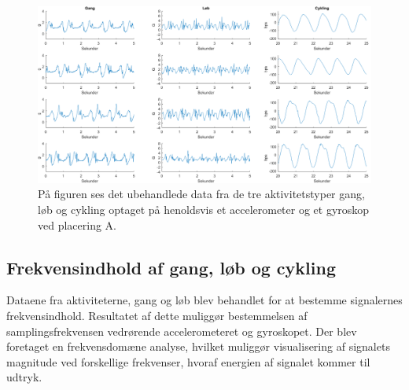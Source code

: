 \begin{figure}[H]
	\centering
	\includegraphics[scale=0.38]{figures/qBilag/raa_data}
	\caption{På figuren ses det ubehandlede data fra de tre aktivitetstyper gang, løb og cykling optaget på henoldsvis et accelerometer og et gyroskop ved placering A.}
	\label{raa_data}
\end{figure}


\subsection{Frekvensindhold af gang, løb og cykling}
Dataene fra aktiviteterne, gang og løb blev behandlet for at bestemme signalernes frekvensindhold. Resultatet af dette muliggør bestemmelsen af samplingsfrekvensen vedrørende accelerometeret og gyroskopet. Der blev foretaget en frekvensdomæne analyse, hvilket muliggør visualisering af signalets magnitude ved forskellige frekvenser, hvoraf energien af signalet kommer til udtryk.


